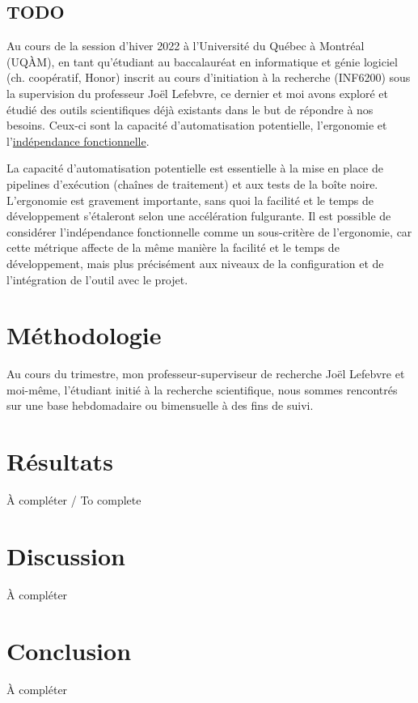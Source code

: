 \documentclass{article}
\begin{document}
  \subsection{TODO} %
  \label{subsec:todo}
  Au cours de la session d'hiver 2022 à l'Université du Québec à Montréal (UQÀM), en tant qu'étudiant au baccalauréat en informatique et génie logiciel (ch.
  coopératif, Honor) inscrit au cours d'initiation à la recherche (INF6200) sous la supervision du professeur Joël Lefebvre, ce dernier et moi avons exploré et étudié
  des outils scientifiques déjà existants dans le but de répondre à nos besoins.
  Ceux-ci sont la capacité d'automatisation potentielle, l'ergonomie et l'\href{https://fr.wikipedia.org/wiki/Ind%C3%A9pendance_fonctionnelle}{indépendance
  fonctionnelle}.

  La capacité d'automatisation potentielle est essentielle à la mise en place de pipelines d'exécution (chaînes de traitement) et aux tests de la boîte noire.
  L'ergonomie est gravement importante, sans quoi la facilité et le temps de développement s'étaleront selon une accélération fulgurante.
  Il est possible de considérer l'indépendance fonctionnelle comme un sous-critère de l'ergonomie, car cette métrique affecte de la même manière la facilité et le
  temps de développement, mais plus précisément aux niveaux de la configuration et de l'intégration de l'outil avec le projet.



  \section{Méthodologie}
  \label{sec:methodology}
  Au cours du trimestre, mon professeur-superviseur de recherche Joël Lefebvre et moi-même, l'étudiant initié à la recherche scientifique, nous sommes rencontrés sur
  une base hebdomadaire ou bimensuelle à des fins de suivi.


  \section{Résultats}
  \label{sec:results}
  À compléter / To complete


  \section{Discussion}
  \label{sec:discussion}
  À compléter


  \section{Conclusion}
  À compléter
\end{document}
